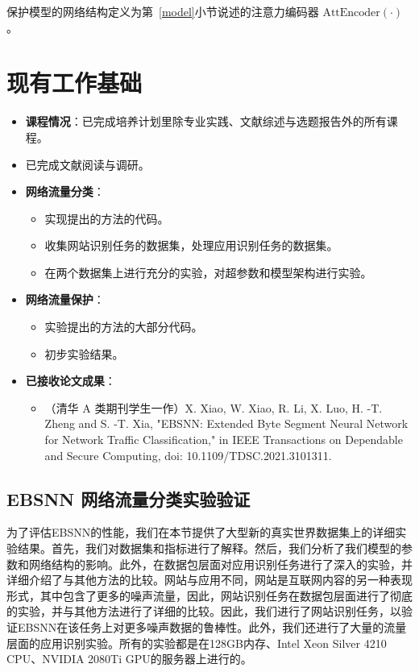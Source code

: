 \documentclass[degree=master,cjk-font=noto]{thuthesis}
\begin{document}
保护模型的网络结构定义为第~\ref{model}小节说述的注意力编码器 $\text{AttEncoder}(\cdot)$。

\chapter{现有工作基础}

\begin{itemize}
	\item \textbf{课程情况}：已完成培养计划里除专业实践、文献综述与选题报告外的所有课程。
	\item 已完成文献阅读与调研。
	\item \textbf{网络流量分类}：
	\begin{itemize}
		\item 实现提出的方法的代码。
		\item 收集网站识别任务的数据集，处理应用识别任务的数据集。
		\item 在两个数据集上进行充分的实验，对超参数和模型架构进行实验。
	\end{itemize}
	\item \textbf{网络流量保护}：
	\begin{itemize}
		\item 实验提出的方法的大部分代码。
		\item 初步实验结果。
	\end{itemize}
	\item \textbf{已接收论文成果}：
	\begin{itemize}
		\item （清华 A 类期刊学生一作）X. Xiao, W. Xiao, R. Li, X. Luo, H. -T. Zheng and S. -T. Xia, "EBSNN: Extended Byte Segment Neural Network for Network Traffic Classification," in IEEE Transactions on Dependable and Secure Computing, doi: 10.1109/TDSC.2021.3101311.
	\end{itemize}
\end{itemize}

\section{EBSNN 网络流量分类实验验证}

为了评估EBSNN的性能，我们在本节提供了大型新的真实世界数据集上的详细实验结果。首先，我们对数据集和指标进行了解释。然后，我们分析了我们模型的参数和网络结构的影响。此外，在数据包层面对应用识别任务进行了深入的实验，并详细介绍了与其他方法的比较。网站与应用不同，网站是互联网内容的另一种表现形式，其中包含了更多的噪声流量，因此，网站识别任务在数据包层面进行了彻底的实验，并与其他方法进行了详细的比较。因此，我们进行了网站识别任务，以验证EBSNN在该任务上对更多噪声数据的鲁棒性。此外，我们还进行了大量的流量层面的应用识别实验。所有的实验都是在128GB内存、Intel Xeon Silver 4210 CPU、NVIDIA 2080Ti GPU的服务器上进行的。
\end{document}
